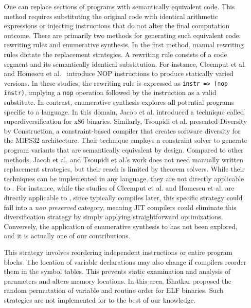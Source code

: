 One can replace sections of programs with semantically equivalent code. 
This method requires substituting the original code with identical arithmetic expressions or injecting instructions that do not alter the final computation outcome. 
There are primarily two methods for generating such equivalent code: rewriting rules and enumerative synthesis. 
In the first method, manual rewriting rules dictate the replacement strategies. 
A rewriting rule consists of a code segment and its semantically identical substitution. 
For instance, Cleemput et al. \cite{Cleemput2012} and Homescu et al.~\cite{homescu2013profile} introduce NOP instructions to produce statically varied versions. 
In these studies, the rewriting rule is expressed as \texttt{instr => (nop instr)}, implying a \texttt{nop} operation followed by the instruction as a valid substitute.
In contrast, enumerative synthesis explores all potential programs specific to a language. 
In this domain, Jacob et al. \cite{jacob2008superdiversifier} introduced a technique called superdiversification for x86 binaries. 
Similarly, Tsoupidi et al. \cite{Tsoupidi2020ConstraintBasedSD} presented Diversity by Construction, a constraint-based compiler that creates software diversity for the MIPS32 architecture.  
Their technique employs a constraint solver to generate program variants that are semantically equivalent by design.
Compared to other methods, Jacob et al. and Tsoupidi et al.'s work does not need manually written replacement strategies, but their reach is limited by theorem solvers.
While their techniques can be implemented in any language, they are not directly applicable to \Wasm.
For instance, while the studies of Cleemput et al. and Homescu et al. are directly applicable to \Wasm, since \Wasm typically compiles later, this specific strategy could fall into a \emph{non preserved} category, meaning JIT compilers could eliminate this diversification strategy by simply applying straightforward optimizations.
Conversely, the application of enumerative synthesis to \Wasm has not been explored, and it is actually one of our contributions. 


This strategy involves reordering independent instructions or entire program blocks.
The location of variable declarations may also change if compilers reorder them in the symbol tables. This prevents static examination and analysis of parameters and alters memory locations. In this area, Bhatkar \etal \cite{bhatkar03, bhatkar2005efficient} proposed the random permutation of variable and routine order for ELF binaries.
Such strategies are not implemented for \Wasm to the best of our knowledge.

